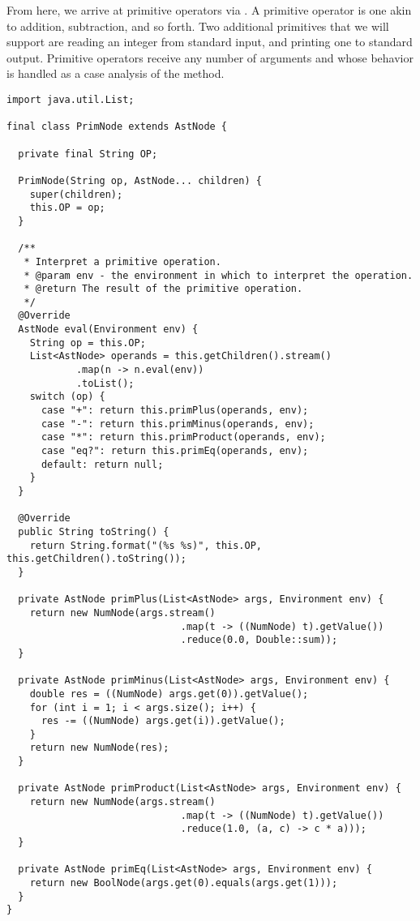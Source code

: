 From here, we arrive at primitive operators via . A primitive operator is one akin to addition, subtraction, and so forth. Two additional primitives that we will support are reading an integer from standard input, and printing one to standard output. Primitive operators receive any number of arguments and whose behavior is handled as a case analysis of the  method. 

\enlargethispage{-3\baselineskip}
\begin{lstlisting}[language=MyJava]
import java.util.List;

final class PrimNode extends AstNode {

  private final String OP;

  PrimNode(String op, AstNode... children) {
    super(children);
    this.OP = op;
  }

  /**
   * Interpret a primitive operation.
   * @param env - the environment in which to interpret the operation.
   * @return The result of the primitive operation.
   */
  @Override
  AstNode eval(Environment env) {
    String op = this.OP;
    List<AstNode> operands = this.getChildren().stream()
            .map(n -> n.eval(env))
            .toList();
    switch (op) {
      case "+": return this.primPlus(operands, env);
      case "-": return this.primMinus(operands, env);
      case "*": return this.primProduct(operands, env);
      case "eq?": return this.primEq(operands, env);
      default: return null;
    }
  }

  @Override
  public String toString() {
    return String.format("(%s %s)", this.OP, this.getChildren().toString());
  }

  private AstNode primPlus(List<AstNode> args, Environment env) {
    return new NumNode(args.stream()
                              .map(t -> ((NumNode) t).getValue())
                              .reduce(0.0, Double::sum));
  }

  private AstNode primMinus(List<AstNode> args, Environment env) {
    double res = ((NumNode) args.get(0)).getValue();
    for (int i = 1; i < args.size(); i++) {
      res -= ((NumNode) args.get(i)).getValue();
    }
    return new NumNode(res);
  }

  private AstNode primProduct(List<AstNode> args, Environment env) {
    return new NumNode(args.stream()
                              .map(t -> ((NumNode) t).getValue())
                              .reduce(1.0, (a, c) -> c * a)));
  }

  private AstNode primEq(List<AstNode> args, Environment env) {
    return new BoolNode(args.get(0).equals(args.get(1)));
  }
}
\end{lstlisting}

